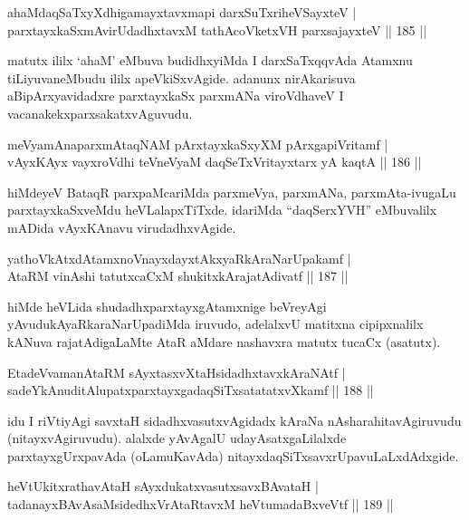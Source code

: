 \vskip 5pt
\vskip 5pt
\begin{shl}
ahaMdaqSaTxyXdhigamayxtavxmapi darxSuTxriheVSayxteV |\\
parxtayxkaSxmAvirUdadhxtavxM tathAcoVketxVH parxsajayxteV \hfill || 185 ||
\end{shl}
\vskip 5pt
\begin{artha}
matutx ililx `ahaM' eMbuva budidhxyiMda I darxSaTxqqvAda Atamxnu tiLiyuvaneMbudu ililx apeVkiSxvAgide. adanunx nirAkarisuva aBipArxyavidadxre parxtayxkaSx parxmANa viroVdhaveV I vacanakekx\break parxsakatxvAguvudu.
\end{artha}
\vskip 5pt
\begin{shl}
meVyamAnaparxmAtaqNAM pArxtayxkaSxyXM pArxgapiVritamf |\\
vAyxKAyx vayxroVdhi teVneVyaM daqSeTxVritayxtarx yA kaqtA \hfill || 186 ||
\end{shl}
\vskip 5pt
\begin{artha}
hiMdeyeV BataqR parxpaMcariMda parxmeVya, parxmANa, parxmAta-\break ivugaLu parxtayxkaSxveMdu heVLalapxTiTxde. idariMda ``daqSerxYVH'' eMbuvalilx mADida vAyxKAnavu virudadhxvAgide.
\end{artha}
\vskip 5pt
\begin{shl}
yathoVkAtxdAtamxnoV\s nayxdayxtAkxyaRkAraNarUpakamf |\\
AtaRM vinAshi tatutxcaCxM shukitxkArajatAdivatf \hfill || 187 ||
\end{shl}
\vskip 5pt
\begin{artha}
hiMde heVLida shudadhxparxtayxgAtamxnige beVreyAgi yAvudu\break kAyaRkaraNarUpadiMda iruvudo, adelalxvU matitxna cipipxnalilx kANuva rajatAdigaLaMte AtaR aMdare nashavxra matutx tucaCx (asatutx).
\end{artha}
\vskip 5pt
\begin{shl}
EtadeVvamanAtaRM sAyxtasxvXtaHsidadhxtavxkAraNAtf |\\
sadeYkAnuditAlupatxparxtayxgadaqSiTxsatatatxvXkamf \hfill || 188 ||
\end{shl}
\vskip 5pt
\begin{artha}
idu I riVtiyAgi savxtaH sidadhxvasutxvAgidadx kAraNa nAsharahitavAgiruvudu (nitayxvAgiruvudu). alalxde yAvAgalU udayAsatxgaLilalxde parxtayxgUrxpavAda (oLamuKavAda) nitayxdaqSiTx\break savxrUpavuLaLxdAdxgide.
\end{artha}
\vskip 5pt
\vskip 5pt
\begin{shl}
heVtUkitxrathavA\s taH sAyxdukatxvasutxsavxBAvataH |\\
tadanayxBAvAsaMsidedhxVrAtaRtavxM heVtumadaBxveVtf \hfill || 189 ||
\end{shl}
